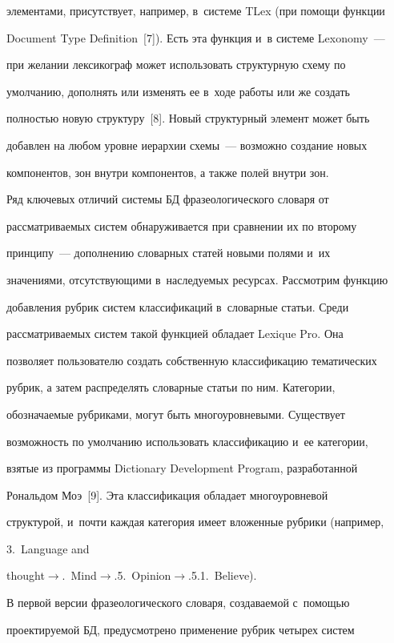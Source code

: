 элементами, присутствует, например, в~системе TLex (при помощи функции 

Document Type Definition~[7]). Есть эта функция и~в системе Lexonomy~--- 

при желании лексикограф может использовать структурную схему по 

умолчанию, дополнять или изменять ее в~ходе работы или же создать 

полностью новую структуру~[8]. Новый структурный элемент может быть 

добавлен на любом уровне иерархии схемы~--- возможно создание новых 

компонентов, зон внутри компонентов, а также полей внутри зон.

   

   Ряд ключевых отличий системы БД фразеологического словаря от 

рас\-смат\-ри\-ва\-емых сис\-тем обнаруживается при сравнении их по второму 

принципу~--- дополнению словарных статей новыми полями и~их 

значениями, отсутствующими в~наследуемых ресурсах. Рассмотрим функцию 

добавления рубрик систем классификаций в~словарные статьи. Среди 

рассматриваемых систем такой функцией обладает Lexique Pro. Она 

позволяет пользователю создать собственную классификацию тематических 

рубрик, а затем распределять словарные статьи по ним. Категории, 

обозначаемые рубриками, могут быть многоуровневыми. Существует 

возможность по умолчанию использовать классификацию и~ее категории, 

взятые из программы Dictionary Development Program, разработанной 

Рональдом Моэ~[9]. Эта классификация обладает многоуровневой 

структурой, и~почти каждая категория имеет вложенные рубрики (например, 

3.~Language and 

thought\;$\to$.~Mind\;$\to$.5.~Opinion\;$\to$.5.1.~Believe). 

   

   В первой версии фразеологического словаря, создаваемой с~помощью 

проектируемой БД, предусмотрено применение рубрик четырех систем 

